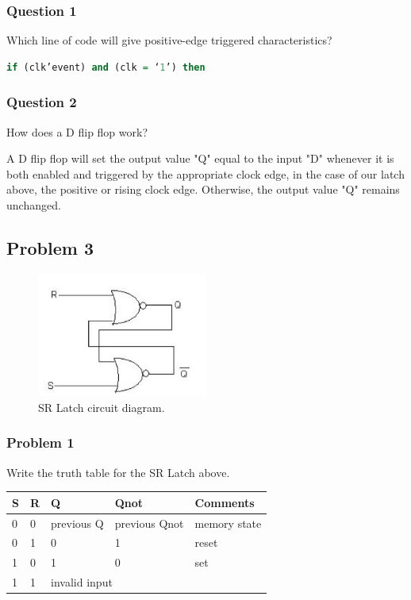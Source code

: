 \documentclass[11pt]{article}
\begin{document}
\subsubsection{Question 1}
Which line of code will give positive-edge triggered characteristics?
\begin{lstlisting}[language=VHDL]
if (clk’event) and (clk = ‘1’) then
\end{lstlisting}

\subsubsection{Question 2}
How does a D flip flop work?

A D flip flop will set the output value "Q" equal to the input "D" whenever it is both enabled and triggered by the appropriate clock edge, in the case of our latch above, the positive or rising clock edge. Otherwise, the output value "Q" remains unchanged.

\subsection{Problem 3}
\begin{figure}
\begin{center}
	\includegraphics[width=0.5\textwidth]{./img5_2.png}
	\caption{\label{fig:srLatch}SR Latch circuit diagram.}
\end{center}
\end{figure}

\subsubsection{Problem 1}
Write the truth table for the SR Latch above.

\begin{table}[H]
\begin{center}
\begin{tabular}{| l | l | l | l | l |}
	\hline
	S & R & Q & Qnot & Comments\\ \hline
	0 & 0 & previous Q & previous Qnot & memory state \\ \hline
	0 & 1 & 0 & 1 & reset \\ \hline
	1 & 0 & 1 & 0 & set \\ \hline
	1 & 1 & \multicolumn{3}{|l|}{invalid input} \\ \hline
\end{tabular}
\end{center}
\end{table}
\end{document}
